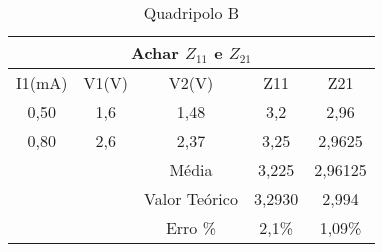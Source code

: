 \begin{table}[!htb]
\centering
\caption{Quadripolo B}
\label{my-label}
\begin{tabular}{@{}ccccc@{}}
\toprule
\multicolumn{5}{c}{Achar $Z_{11}$ e $Z_{21}$}                                                                                                      \\ \midrule
\multicolumn{1}{c|}{I1(mA)} & \multicolumn{1}{c|}{V1(V)} & \multicolumn{1}{c|}{V2(V)}         & \multicolumn{1}{c|}{Z11}    & Z21     \\ \midrule
\multicolumn{1}{c|}{0,50}   & \multicolumn{1}{c|}{1,6}   & \multicolumn{1}{c|}{1,48}          & \multicolumn{1}{c|}{3,2}    & 2,96    \\ \midrule
\multicolumn{1}{c|}{0,80}   & \multicolumn{1}{c|}{2,6}   & \multicolumn{1}{c|}{2,37}          & \multicolumn{1}{c|}{3,25}   & 2,9625  \\ \midrule
                            & \multicolumn{1}{c|}{}      & \multicolumn{1}{c|}{Média}         & \multicolumn{1}{c|}{3,225}  & 2,96125 \\ \cmidrule(l){3-5} 
                            & \multicolumn{1}{c|}{}      & \multicolumn{1}{c|}{Valor Teórico} & \multicolumn{1}{c|}{3,2930} & 2,994   \\ \cmidrule(l){3-5} 
                            & \multicolumn{1}{c|}{}      & \multicolumn{1}{c|}{Erro \%}       & \multicolumn{1}{c|}{2,1\%}  & 1,09\%  \\ \bottomrule
\end{tabular}
\end{table}


